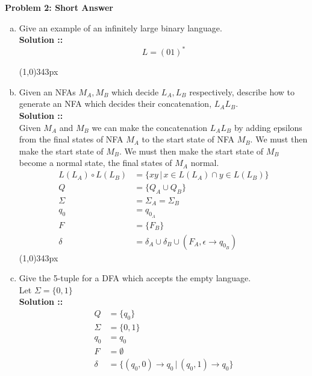 \documentclass[11pt]{article}
\begin{document}
\textbf{Problem 2: Short Answer}
\begin{enumerate}[a)]
\item
Give an example of an infinitely large binary language. \\
\vspace{5px}\textbf{Solution ::}
$$L=(01)^*$$

\line(1,0){343px}

\item
Given an NFAs $M_A, M_B$ which decide $L_A, L_B$ respectively, describe how
to generate an NFA which decides their concatenation, $L_AL_B$. \\
\vspace{5px}\textbf{Solution ::} \\
Given $M_A$ and $M_B$ we can make the concatenation $L_AL_B$ by adding
epsilons from the final states of NFA $M_A$ to the start state of NFA $M_B$.
We must then make the start state of $M_B$. We must then make the start state
of $M_B$ become a normal state, the final states of $M_A$ normal.
\begin{align*}
    L(L_A)\circ L(L_B) &= \{xy \,|\, x\in L(L_A) \cap y\in L(L_B)\} \\
    Q &= \{Q_A\cup Q_B\} \\
    \Sigma &= \Sigma_A = \Sigma_B \\
    q_0 &= q_{0_A} \\
    F &= \{F_B\} \\
    \delta &= \delta_A\cup\delta_B\cup(F_A,\epsilon\longrightarrow q_{0_B})
\end{align*}
\line(1,0){343px}

\item
Give the 5-tuple for a DFA which accepts the empty language. \\
Let $\Sigma = \{0, 1\}$ \\
\vspace{5px}\textbf{Solution ::}
\begin{align*}
    Q &= \{q_0\} \\
    \Sigma &= \{0, 1\} \\
    q_0 &= q_0 \\
    F &= \emptyset \\
    \delta &= \{(q_0, 0)\longrightarrow q_0 \,|\, (q_0, 1)\longrightarrow q_0\}
\end{align*}
\end{enumerate}
\pagebreak

\end{document}
